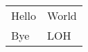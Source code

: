 \documentclass{article}
\begin{document}
\begin{tabular}{ l l }
Hello & World \\
Bye & LOH \\
\end{tabular}
\end{document}

